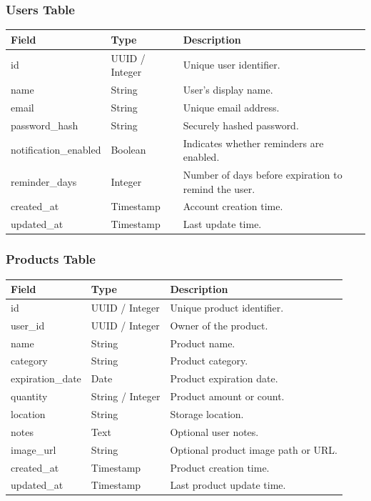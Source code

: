 \documentclass[12pt]{article}
\begin{document}
\subsubsection{Users Table}
\begin{longtable}{|p{}|p{}|p{}|}
\hline
\textbf{Field} & \textbf{Type} & \textbf{Description} \\
\hline
id & UUID / Integer & Unique user identifier. \\
\hline
name & String & User's display name. \\
\hline
email & String & Unique email address. \\
\hline
password\_hash & String & Securely hashed password. \\
\hline
notification\_enabled & Boolean & Indicates whether reminders are enabled. \\
\hline
reminder\_days & Integer & Number of days before expiration to remind the user. \\
\hline
created\_at & Timestamp & Account creation time. \\
\hline
updated\_at & Timestamp & Last update time. \\
\hline
\end{longtable}

\subsubsection{Products Table}
\begin{longtable}{|p{}|p{}|p{}|}
\hline
\textbf{Field} & \textbf{Type} & \textbf{Description} \\
\hline
id & UUID / Integer & Unique product identifier. \\
\hline
user\_id & UUID / Integer & Owner of the product. \\
\hline
name & String & Product name. \\
\hline
category & String & Product category. \\
\hline
expiration\_date & Date & Product expiration date. \\
\hline
quantity & String / Integer & Product amount or count. \\
\hline
location & String & Storage location. \\
\hline
notes & Text & Optional user notes. \\
\hline
image\_url & String & Optional product image path or URL. \\
\hline
created\_at & Timestamp & Product creation time. \\
\hline
updated\_at & Timestamp & Last product update time. \\
\hline
\end{longtable}
\end{document}
